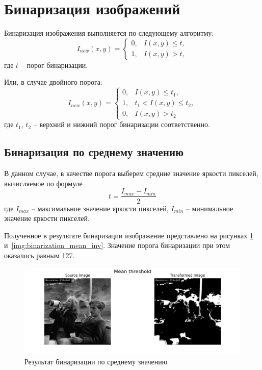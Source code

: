 \section{Бинаризация изображений}

Бинаризация изображения выполняется по следующему алгоритму:
\begin{equation}
    I_{new}(x, y) = \begin{cases}
        0, & I(x, y) \le t,\\
        1, & I(x, y) > t,
    \end{cases}
\end{equation}
где $t$ -- порог бинаризации. 

Или, в случае двойного порога: 
\begin{equation}
    I_{new}(x, y) = \begin{cases}
        0, & I(x, y) \le t_1,\\
        1, & t_1 < I(x, y) \le t_2, \\
        0, & I(x, y) > t_2
     \end{cases}
\end{equation}
где $t_1$, $t_2$ -- верхний и нижний порог бинаризации соответственно. 


\FloatBarrier
\subsection{Бинаризация по среднему значению}
В данном случае, в качестве порога выберем средние значение яркости пикселей, вычисляемое по формуле
\begin{equation}
    t = \frac{I_{max} - I_{min}}{2}
\end{equation}
где $I_{max}$ -- максимальное значение яркости пикселей, $I_{min}$ -- минимальное значение яркости пикселей.

Полученное в результате бинаризации изображение представлено на рисунках \ref{img:binarization_mean} и~\ref{img:binarization_mean_inv}. Значение порога бинаризации при этом оказалось равным 127.
\begin{figure}[ht!]
    \centering
    \includegraphics[width=\textwidth]{../results/Mean threshold.png}
    \caption{Результат бинаризации по среднему значению}
    \label{img:binarization_mean}
\end{figure}

